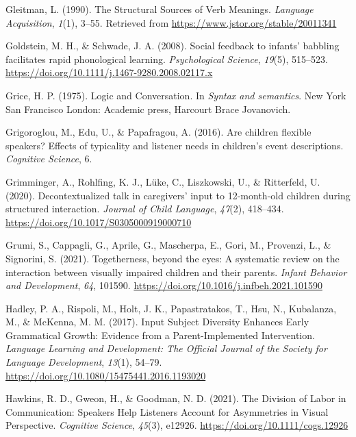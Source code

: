 \documentclass[
  man,floatsintext]{apa6}
\newlength{\cslhangindent}
\newlength{\cslentryspacingunit} %
\newenvironment{CSLReferences}[2] %
 {%
  \setlength{\parindent}{0pt}
  \ifodd #1
  \let\oldpar\par
  \def\par{\hangindent=\cslhangindent\oldpar}
  \fi
  \setlength{\parskip}{#2\cslentryspacingunit}
 }%
 {}
\begin{document}
\begin{CSLReferences}{1}{0}
\leavevmode{}%
Gleitman, L. (1990). The {Structural Sources} of {Verb Meanings}. \emph{Language Acquisition}, \emph{1}(1), 3--55. Retrieved from \url{https://www.jstor.org/stable/20011341}

\leavevmode{}%
Goldstein, M. H., \& Schwade, J. A. (2008). Social feedback to infants' babbling facilitates rapid phonological learning. \emph{Psychological Science}, \emph{19}(5), 515--523. \url{https://doi.org/10.1111/j.1467-9280.2008.02117.x}

\leavevmode{}%
Grice, H. P. (1975). {Logic and Conversation}. In \emph{{Syntax and semantics}}. {New York San Francisco London}: {Academic press, Harcourt Brace Jovanovich}.

\leavevmode{}%
Grigoroglou, M., Edu, U., \& Papafragou, A. (2016). Are children flexible speakers? {Effects} of typicality and listener needs in children's event descriptions. \emph{Cognitive Science}, 6.

\leavevmode{}%
Grimminger, A., Rohlfing, K. J., Lüke, C., Liszkowski, U., \& Ritterfeld, U. (2020). Decontextualized talk in caregivers' input to 12-month-old children during structured interaction. \emph{Journal of Child Language}, \emph{47}(2), 418--434. \url{https://doi.org/10.1017/S0305000919000710}

\leavevmode{}%
Grumi, S., Cappagli, G., Aprile, G., Mascherpa, E., Gori, M., Provenzi, L., \& Signorini, S. (2021). Togetherness, beyond the eyes: {A} systematic review on the interaction between visually impaired children and their parents. \emph{Infant Behavior and Development}, \emph{64}, 101590. \url{https://doi.org/10.1016/j.infbeh.2021.101590}

\leavevmode{}%
Hadley, P. A., Rispoli, M., Holt, J. K., Papastratakos, T., Hsu, N., Kubalanza, M., \& McKenna, M. M. (2017). Input {Subject Diversity Enhances Early Grammatical Growth}: {Evidence} from a {Parent-Implemented Intervention}. \emph{Language Learning and Development: The Official Journal of the Society for Language Development}, \emph{13}(1), 54--79. \url{https://doi.org/10.1080/15475441.2016.1193020}

\leavevmode{}%
Hawkins, R. D., Gweon, H., \& Goodman, N. D. (2021). The {Division} of {Labor} in {Communication}: {Speakers Help Listeners Account} for {Asymmetries} in {Visual Perspective}. \emph{Cognitive Science}, \emph{45}(3), e12926. \url{https://doi.org/10.1111/cogs.12926}


\end{CSLReferences}
\end{document}
